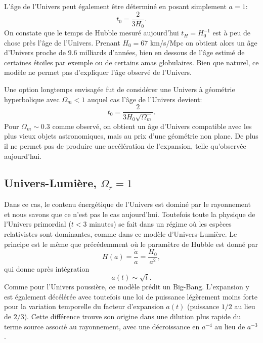 L'âge de l'Univers peut également être déterminé en posant simplement $a=1$:
\begin{equation}
t_0=\frac{2}{3H_0}.
\end{equation}
On constate que le temps de Hubble mesuré aujourd'hui $t_H=H_0^{-1}$ est à peu de chose près l'âge de l'Univers. Prenant $H_0=67$ km/s/Mpc on obtient alors un âge d'Univers proche de 9.6 milliards d'années, bien en dessous de l'âge estimé de certaines étoiles par exemple ou de certains amas globulaires.  Bien que naturel, ce modèle ne permet pas d'expliquer l'âge observé de l'Univers. 

Une option longtemps envisagée fut de considérer une Univers à géométrie hyperbolique avec $\Omega_m<1$ auquel cas l'âge de l'Univers devient:
\begin{equation}
t_0=\frac{2}{3H_0\sqrt{\Omega_m}}.
\end{equation}
Pour $\Omega_m\sim0.3$ comme observé, on obtient un âge d'Univers compatible avec les plus vieux objets astronomiques, mais au prix d'une géométrie non plane. De plus il ne permet pas de produire une accélération de l'expansion, telle qu'observée aujourd'hui.

\subsection{Univers-Lumière, $\Omega_r=1$}
Dans ce cas, le contenu énergétique de l'Univers est dominé par le rayonnement et nous savons que ce n'est pas le cas aujourd'hui. Toutefois toute la physique de l'Univers primordial ($t<3$ minutes) se fait dans un régime où les espèces relativistes sont dominantes, comme dans ce modèle d'Univers-Lumière. Le principe est le même que précédemment où le paramètre de Hubble est donné par 
\begin{equation}
H(a)=\frac{\dot a}{a}=\frac{H_0}{a^2},
\end{equation} 
qui donne après intégration
\begin{equation}
a(t)\sim\sqrt{t}.
\end{equation}
Comme pour l'Univers poussière, ce modèle prédit un Big-Bang. L'expansion y est également décélérée avec toutefois une loi de puissance légèrement moins forte pour la variation temporelle du facteur d'expansion $a(t)$ (puissance $1/2$ au lieu de $2/3$). Cette différence trouve son origine dans une dilution plus rapide du terme source associé au rayonnement, avec une décroissance en $a^{-4}$ au lieu de $a^{-3}$.

